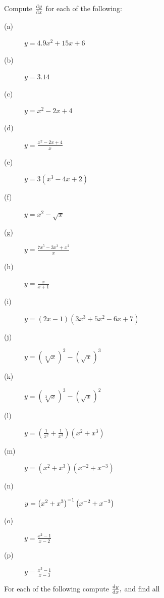 \begin{ProblemSection}
  \begin{myproblem}{}
    Compute $\frac{\text{d}{y}}{\text{d}{x}}$ for each of the following:
    \begin{multicols}{2}
      \begin{description}
      \item[(a)] $\displaystyle y=4.9x^2+15x+6$                                                   
      \item[(b)] $\displaystyle y=3.14$                                                           
      \item[(c)] $\displaystyle y=x^2-2x+4$                                                         
      \item[(d)] $\displaystyle y=\frac{x^2-2x+4}{x}$ 
      \item[(e)] $\displaystyle y=3(x^3-4x+2)$                                                    
      \item[(f)] $\displaystyle y=x^2-\sqrt{x}$                                                   
      \item[(g)] $\displaystyle y=\frac{7x^5-3x^3+x^2}{x}$                                        
      \item[(h)] $\displaystyle y=\frac{x}{x+1}$                                                  
      \item[(i)] $\displaystyle y=(2x-1)(3x^3+5x^2-6x+7)$                                         
      \item[(j)] $\displaystyle y=\left(\sqrt[3]{x}\right)^2-\left(\sqrt{x}\right)^3$             
      \item[(k)] $\displaystyle y=\left(\sqrt[3]{x}\right)^3-\left(\sqrt{x}\right)^2$             
      \item[(l)] $\displaystyle y=\left(\frac{1}{x^2}+\frac{1}{x^3}\right)\left(x^2+x^3\right)$  
      \item[(m)] $\displaystyle y=\left(x^2+x^3\right)\left(x^{-2}+x^{-3}\right)$  
      \item[(n)] $\displaystyle y=\left(x^2+x^3\right)^{-1}\left(x^{-2}+x^{-3}\right)$  
      \item[(o)] $\displaystyle y=\frac{x^2-1}{x-2}$
      \item[(p)] $\displaystyle y=\frac{x^3-1}{x-3}$
      \end{description}
    \end{multicols}
  \end{myproblem}
  \begin{myproblem}{}
    For each of the following compute $\frac{\text{d}{y}}{\text{d}{x}},$ and find all

\end{myproblem}
\end{ProblemSection}
